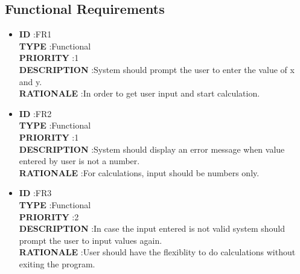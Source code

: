 \documentclass[a4paper,12pt]{article}
\begin{document}
\subsection{Functional Requirements}
\begin{itemize}
	
	\item \textbf{ID } \hspace{3cm} :FR1  \\
	\textbf{TYPE } \hspace{2.27cm}  :Functional\\
	\textbf{PRIORITY } \hspace{1.15cm} :1 \\
	\textbf{DESCRIPTION }\hspace{0.35cm} :System should prompt the user to enter the value of x and y. \\
	\textbf{RATIONALE } \hspace{0.75cm} :In order to get user input and start calculation. \\
	
	
	\item \textbf{ID } \hspace{3cm} :FR2  \\
	\textbf{TYPE } \hspace{2.27cm}  :Functional\\
	\textbf{PRIORITY } \hspace{1.15cm} :1 \\
	\textbf{DESCRIPTION }\hspace{0.35cm} :System should display an error message when value entered by user is not a number. \\
	\textbf{RATIONALE } \hspace{0.75cm} :For calculations, input should be numbers only.  \\
	
	
	\item \textbf{ID } \hspace{3cm} :FR3  \\
	\textbf{TYPE } \hspace{2.27cm}  :Functional\\
	\textbf{PRIORITY } \hspace{1.15cm} :2 \\
	\textbf{DESCRIPTION }\hspace{0.35cm} :In case the input entered is not valid system should prompt the user to input values again. \\
	\textbf{RATIONALE } \hspace{0.75cm} :User should have the flexiblity to do calculations without exiting the program.  \\
	

\end{itemize}
\end{document}
